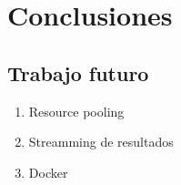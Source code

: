 \chapter{Conclusiones}
\label{chap:conclusions}

\section{Trabajo futuro}

\begin{enumerate}
\item{Resource pooling}
\item{Streamming de resultados}
\item{Docker}
\end{enumerate}
